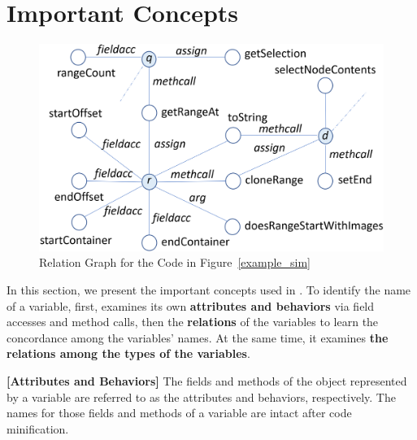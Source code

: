 \section{Important Concepts}
\label{sec:concepts}

\begin{figure}[t]
	\begin{center}
	  \includegraphics[width=0.9\columnwidth]{figures/relation-graph}
          \vspace{-6pt}
		\caption{Relation Graph for the Code in Figure~\ref{example_sim}}
		\label{rel-graph}
	\end{center}
\end{figure}





In this section, we present the important concepts used in {\tool}.
To identify the name of a variable, first, {\tool} examines its own
{\bf attributes and behaviors} via field accesses and method calls,
then the {\bf relations} of the variables to learn the concordance
among the variables' names. At the same time, it examines {\bf the
relations among the types of the variables}.


\begin{definition}{\bf [Attributes and Behaviors]}
  The fields and methods of the object represented by a variable are
  referred to as the attributes and behaviors, respectively. The names
  for those fields and methods of a variable are intact after code
  minification.
\end{definition}

